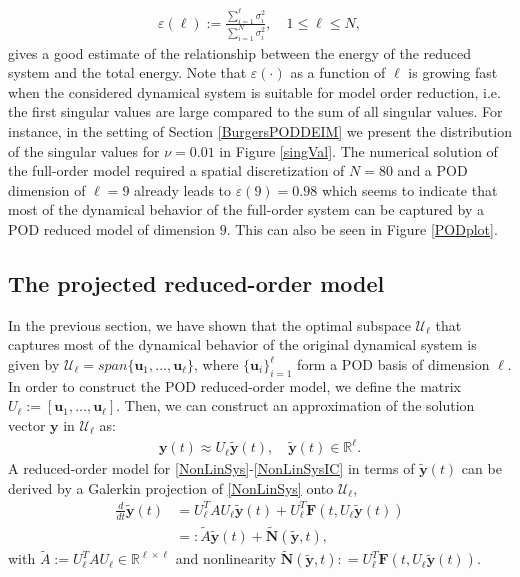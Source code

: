 \begin{align}
\label{heuristics}
\varepsilon(\ell) := \frac{\sum_{i=1}^\ell \sigma_i^2}{\sum_{i=1}^N \sigma_i^2}, \quad 1 \leq \ell \leq N,
\end{align}
 gives a good estimate of the relationship between the energy of the reduced system and the total energy. Note that $\varepsilon(\cdot)$ as a function of $\ell$ is growing fast when the considered dynamical system is suitable for model order reduction, i.e. the first singular values are large compared to the sum of all singular values. For instance, in the setting of Section \ref{BurgersPODDEIM} we present the distribution of the singular values for $\nu = 0.01$ in Figure \ref{singVal}. The numerical solution of the full-order model required a spatial discretization of $N = 80$ and a POD dimension of $\ell = 9$ already leads to $\varepsilon(9) = 0.98$ which seems to indicate that most of the dynamical behavior of the full-order system can be captured by a POD reduced model of dimension $9$. This can also be seen in Figure \ref{PODplot}.
\subsection{The projected reduced-order model}
In the previous section, we have shown that the optimal subspace $\mathcal{U}_\ell$ that captures most of the dynamical behavior of the original dynamical system is given by $\mathcal{U}_\ell = span \{\mathbf{u}_1,...,\mathbf{u}_\ell\}$, where $\{\mathbf{u}_i\}_{i=1}^\ell$ form a POD basis of dimension $\ell$. In order to construct the POD reduced-order model, we define the matrix $U_\ell := [\mathbf{u}_1,...,\mathbf{u}_\ell]$. Then, we can construct an approximation of the solution vector $\mathbf{y}$ in $\mathcal{U}_\ell$ as:
\begin{align*}
\mathbf{y}(t) \approx U_\ell \mathbf{\tilde y}(t), \quad \mathbf{\tilde y}(t) \in \mathbb{R}^\ell.
\end{align*}
A reduced-order model for \eqref{NonLinSys}-\eqref{NonLinSysIC} in terms of $\mathbf{\tilde y}(t)$ can be derived by a Galerkin projection of \eqref{NonLinSys} onto $\mathcal{U}_\ell$,
\begin{align}
\label{GalProj}
\frac{d}{dt} \mathbf{\tilde y}(t) &= U_\ell^T A U_\ell \mathbf{\tilde y}(t) + U_\ell^T \mathbf{F}(t,U_\ell\mathbf{\tilde y}(t)) \nonumber \\
 &=: \tilde A \mathbf{\tilde y}(t) + \mathbf{\tilde N}(\mathbf{\tilde y},t),
\end{align}
with $\tilde A := U_\ell^T A U_\ell \in \mathbb{R}^{\ell \times \ell}$ and nonlinearity $\mathbf{\tilde N}(\mathbf{\tilde y},t) : = U_\ell^T \mathbf{F}(t,U_\ell\mathbf{\tilde y}(t))$.


